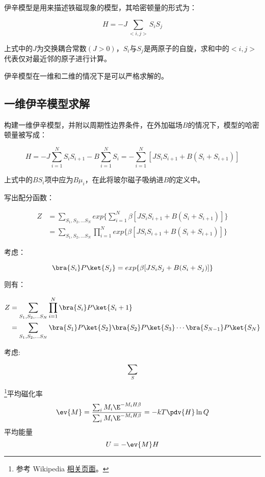 
\begin{issues}
\issueDraft
\issueMissDepend
\end{issues}

伊辛模型是用来描述铁磁现象的模型，其哈密顿量的形式为：

\begin{equation}
H=-J\sum\limits_{<i,j>}S_iS_j
\end{equation}

上式中的$J$为交换耦合常数$(J>0)$，$S_i$与$S_j$是两原子的自旋，求和中的$<i,j>$代表仅对最近邻的原子进行计算。

伊辛模型在一维和二维的情况下是可以严格求解的。

\subsection{一维伊辛模型求解}

构建一维伊辛模型，并附以周期性边界条件，在外加磁场$B$的情况下，模型的哈密顿量被写成：

\begin{equation}
H=-J\sum\limits_{i=1}^NS_iS_{i+1}-B\sum\limits_{i=1}^NS_i=-\sum\limits_{i=1}^N[JS_iS_{i+1}+B(S_i+S_{i+1})]
\end{equation}

上式中的$BS_i$项中应为$B\mu_i$，在此将玻尔磁子吸纳进$B$的定义中。

写出配分函数：

\begin{align}
Z&=\sum\limits_{S_1,S_2,...S_N}exp\{\sum\limits_{i=1}^N\beta[JS_iS_{i+1}+B(S_i+S_{i+1})]\} \\
&=\sum\limits_{S_1,S_2,...S_N}\prod\limits_{i=1}^N exp\{\beta[JS_iS_{i+1}+B(S_i+S_{i+1})]\}
\end{align}

考虑：

\begin{equation}
\bra{S_i}P\ket{S_j}=exp\{\beta[JS_iS_{j}+B(S_i+S_{j})]\}
\end{equation}

则有：

\begin{align}
Z&=\sum\limits_{S_1,S_2,...S_N}\prod\limits_{i=1}^N\bra{S_i}P\ket{S_i+1} \\
&=\sum\limits_{S_1,S_2,...S_N}\bra{S_1}P\ket{S_2} \bra{S_2}P\ket{S_3}\cdots\bra{S_{N-1}}P\ket{S_N} 
\end{align}

考虑:

\begin{equation}
\sum_S
\end{equation}










\footnote{参考 Wikipedia \href{https://en.wikipedia.org/wiki/Ising_model}{相关页面}。}平均磁化率
\begin{equation}
\ev{M} = \frac{\sum_i M_i \E^{-M_i H \beta}}{\sum_i M_i \E^{-M_i H\beta}} = -kT \pdv{H} \ln Q
\end{equation}
平均能量
\begin{equation}
U = - \ev{M} H
\end{equation}
